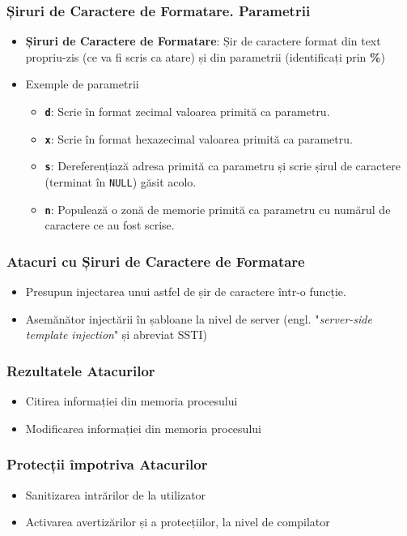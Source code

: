 \documentclass[xcolor={table}]{beamer}
\begin{document}
	\begin{frame}
		\frametitle{Șiruri de Caractere de Formatare. Parametrii}\pause
		\begin{itemize}[<+->]
		    \item \textbf{Șiruri de Caractere de Formatare}: Șir de caractere format din text propriu-zis (ce va fi scris ca atare) și din parametrii (identificați prin \textbf{\%})
		    \item Exemple de parametrii
    	        \begin{itemize}
    		        \item \textbf{\texttt{d}}: Scrie în format zecimal valoarea primită ca parametru.
    		        \item \textbf{\texttt{x}}: Scrie în format hexazecimal valoarea primită ca parametru.
    		        \item \textbf{\texttt{s}}: Dereferențiază adresa primită ca parametru și scrie șirul de caractere (terminat în \texttt{NULL}) găsit acolo.
    		        \item \textbf{\texttt{n}}: Populează o zonă de memorie primită ca parametru cu numărul de caractere ce au fost scrise.
    		    \end{itemize}
		\end{itemize}
	\end{frame}
	
	\begin{frame}
		\frametitle{Atacuri cu Șiruri de Caractere de Formatare}\pause
		\begin{itemize}[<+->]
		    \item Presupun injectarea unui astfel de șir de caractere într-o funcție.
		    \item Asemănător injectării în șabloane la nivel de server (engl. "\textit{server-side template injection}" și abreviat SSTI)
		\end{itemize}
	\end{frame}
	
	\begin{frame}
		\frametitle{Rezultatele Atacurilor}\pause
		\begin{itemize}[<+->]
		    \item Citirea informației din memoria procesului
			\item Modificarea informației din memoria procesului
		\end{itemize}
	\end{frame}
	
	\begin{frame}
		\frametitle{Protecții împotriva Atacurilor}\pause
		\begin{itemize}[<+->]
			\item Sanitizarea intrărilor de la utilizator
			\item Activarea avertizărilor și a protecțiilor, la nivel de compilator
		\end{itemize}
	\end{frame}
\end{document}
